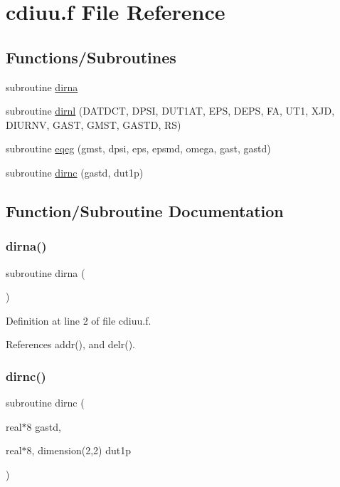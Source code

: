 \hypertarget{cdiuu_8f}{}\section{cdiuu.\+f File Reference}
\label{cdiuu_8f}
\subsection*{Functions/\+Subroutines}
\begin{DoxyCompactItemize}
\item 
subroutine \hyperlink{cdiuu_8f_a7d9f897dfdb255f00c14010c93ce63fc}{dirna}
\item 
subroutine \hyperlink{cdiuu_8f_af600fe33d7c5f30bef94ae042d07b5fa}{dirnl} (D\+A\+T\+D\+CT, D\+P\+SI, D\+U\+T1\+AT, E\+PS, D\+E\+PS, FA, U\+T1, X\+JD, D\+I\+U\+R\+NV, G\+A\+ST, G\+M\+ST, G\+A\+S\+TD, RS)
\item 
subroutine \hyperlink{cdiuu_8f_aa985762c7815110573474373be8645fb}{eqeg} (gmst, dpsi, eps, epsmd, omega, gast, gastd)
\item 
subroutine \hyperlink{cdiuu_8f_a546cf71e3beb8a6b66da1fe491c7a2b3}{dirnc} (gastd, dut1p)
\end{DoxyCompactItemize}


\subsection{Function/\+Subroutine Documentation}
\mbox{\label{cdiuu_8f_a7d9f897dfdb255f00c14010c93ce63fc}} 
\subsubsection{\texorpdfstring{dirna()}{dirna()}}
{\footnotesize\ttfamily subroutine dirna (\begin{DoxyParamCaption}{ }\end{DoxyParamCaption})}



Definition at line 2 of file cdiuu.\+f.



References addr(), and delr().

\mbox{\label{cdiuu_8f_a546cf71e3beb8a6b66da1fe491c7a2b3}} 
\subsubsection{\texorpdfstring{dirnc()}{dirnc()}}
{\footnotesize\ttfamily subroutine dirnc (\begin{DoxyParamCaption}\item[{real$\ast$8}]{gastd,  }\item[{real$\ast$8, dimension(2,2)}]{dut1p }\end{DoxyParamCaption})}



